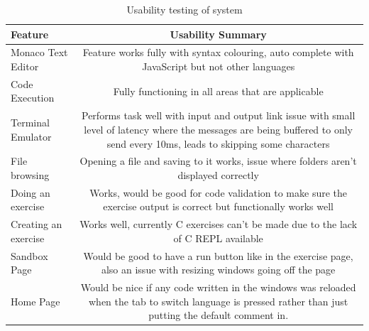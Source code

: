 \begin{table}[h]
    \centering
    \begin{tabulary}{\textwidth}{l|C}
        \textbf{Feature} & \textbf{Usability Summary}\\
        \hline
        Monaco Text Editor & Feature works fully with syntax colouring, auto complete with JavaScript but not other languages\\
        \hline
        Code Execution & Fully functioning in all areas that are applicable\\
        \hline
        Terminal Emulator & Performs task well with input and output link issue with small level of latency where the messages are being buffered to only send every 10ms, leads to skipping some characters\\
        \hline
        File browsing & Opening a file and saving to it works, issue where folders aren't displayed correctly\\
        \hline
        Doing an exercise & Works, would be good for code validation to make sure the exercise output is correct but functionally works well\\
        \hline
        Creating an exercise & Works well, currently C exercises can't be made due to the lack of C REPL available\\
        \hline
        Sandbox Page & Would be good to have a run button like in the exercise page, also an issue with resizing windows going off the page\\
        \hline
        Home Page & Would be nice if any code written in the windows was reloaded when the tab to switch language is pressed rather than just putting the default comment in.\\
    \end{tabulary}
    \caption{Usability testing of system}
\end{table}










